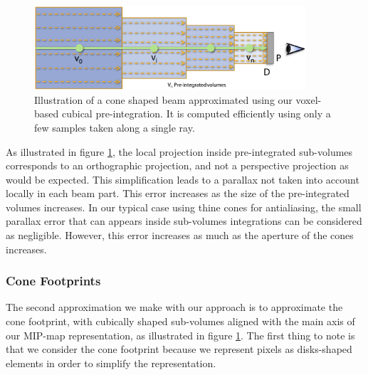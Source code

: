 \begin{figure}\label{f:vct-pre-integration-5}
	\begin{center}
		\includegraphics[width=0.9\textwidth]{graphics/vct/vct-7-5}
	\end{center}
	\caption{Illustration of a cone shaped beam approximated using our voxel-based cubical pre-integration. It is computed efficiently using only a few samples taken along a single ray.}
\end{figure}

As illustrated in figure \ref{f:vct-pre-integration-5}, the local projection inside pre-integrated sub-volumes corresponds to an orthographic projection, and not a perspective projection as would be expected. This simplification leads to a parallax not taken into account locally in each beam part. This error increases as the size of the pre-integrated volumes increases. In our typical case using thine cones for antialiasing, the small parallax error that can appears inside sub-volumes integrations can be considered as negligible. However, this error increases as much as the aperture of the cones increases.



\subsubsection{Cone Footprints}
The second approximation we make with our approach is to approximate the cone footprint, with cubically shaped sub-volumes aligned with the main axis of our MIP-map representation, as illustrated in figure \ref{f:vct-pre-integration-5}. The first thing to note is that we consider the cone footprint because we represent pixels as disks-shaped elements in order to simplify the representation.

